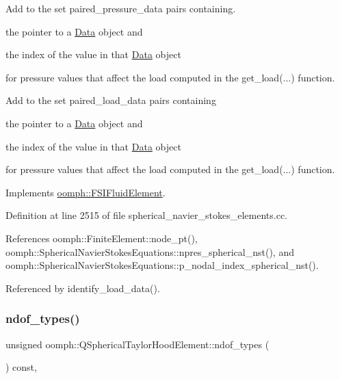 Add to the set {\ttfamily paired\+\_\+pressure\+\_\+data} pairs containing. 


\begin{DoxyItemize}
\item the pointer to a \hyperlink{classoomph_1_1Data}{Data} object and
\item the index of the value in that \hyperlink{classoomph_1_1Data}{Data} object
\end{DoxyItemize}for pressure values that affect the load computed in the {\ttfamily get\+\_\+load}(...) function.

Add to the set {\ttfamily paired\+\_\+load\+\_\+data} pairs containing
\begin{DoxyItemize}
\item the pointer to a \hyperlink{classoomph_1_1Data}{Data} object and
\item the index of the value in that \hyperlink{classoomph_1_1Data}{Data} object
\end{DoxyItemize}for pressure values that affect the load computed in the {\ttfamily get\+\_\+load}(...) function. 

Implements \hyperlink{classoomph_1_1FSIFluidElement_af8e0805b769b7d111eb71f223fc83df8}{oomph\+::\+F\+S\+I\+Fluid\+Element}.



Definition at line 2515 of file spherical\+\_\+navier\+\_\+stokes\+\_\+elements.\+cc.



References oomph\+::\+Finite\+Element\+::node\+\_\+pt(), oomph\+::\+Spherical\+Navier\+Stokes\+Equations\+::npres\+\_\+spherical\+\_\+nst(), and oomph\+::\+Spherical\+Navier\+Stokes\+Equations\+::p\+\_\+nodal\+\_\+index\+\_\+spherical\+\_\+nst().



Referenced by identify\+\_\+load\+\_\+data().

\mbox{\label{classoomph_1_1QSphericalTaylorHoodElement_a3417f97997b87a5cddc499697e227717}} 
\subsubsection{\texorpdfstring{ndof\+\_\+types()}{ndof\_types()}}
{\footnotesize\ttfamily unsigned oomph\+::\+Q\+Spherical\+Taylor\+Hood\+Element\+::ndof\+\_\+types (\begin{DoxyParamCaption}{ }\end{DoxyParamCaption}) const\hspace{0.3cm}{\ttfamily [inline]}, {\ttfamily [virtual]}}



